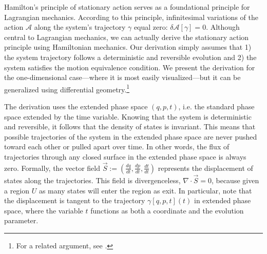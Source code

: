 \documentclass[letterpaper]{article}
\renewcommand{\vector}[1]{\ensuremath{\vec{#1}}} %
\begin{document}

Hamilton's principle of stationary action serves as a foundational principle for Lagrangian mechanics. According to this principle, infinitesimal variations of the action $ \mathscr{A}$ along the system's trajectory $\gamma $ equal zero: $\delta  \mathscr{A}[\gamma] = 0 $. Although central to Lagrangian mechanics, we can actually derive the stationary action principle using Hamiltonian mechanics. Our derivation simply assumes that 1) the system trajectory follows a deterministic and reversible evolution and 2) the system satisfies the motion equivalence condition. We present the derivation for the one-dimensional case---where it is most easily visualized---but it can be generalized using differential geometry.\footnote{For a related argument, see \textcites[236--37, 243--45]{Arnold}.}

The derivation uses the extended phase space $(q, p, t)$, i.e. the standard phase space extended by the time variable. Knowing that the system is deterministic and reversible, it follows that the density of states is invariant. This means that possible trajectories of the system in the extended phase space are never pushed toward each other or pulled apart over time. In other words, the flux of trajectories through any closed surface in the extended phase space is always zero. Formally, the vector field $\vec{S} := (\frac{d q }{d t }, \frac{d p }{d t }, \frac{d t }{d t })$ represents the displacement of states along the trajectories. This field is divergenceless, $\nabla \cdot \vector{S} = 0$, because given a region $U$ as many states will enter the region as exit. In particular, note that the displacement is tangent to the trajectory $\gamma [q, p, t] (t)$ in extended phase space, where the variable $t$ functions as both a coordinate and the evolution parameter.
\end{document}
